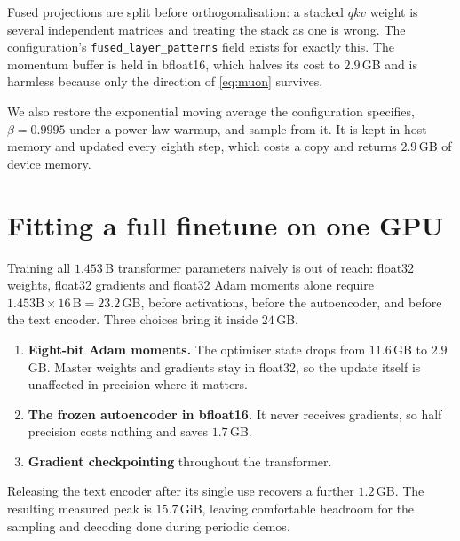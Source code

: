 \documentclass[10pt,twocolumn,letterpaper]{article}
\begin{document}
Fused projections are split before orthogonalisation: a stacked $qkv$ weight is
several independent matrices and treating the stack as one is wrong. The
configuration's \texttt{fused\_layer\_patterns} field exists for exactly this.
The momentum buffer is held in bfloat16, which halves its cost to $2.9$\,GB and
is harmless because only the direction of \eqref{eq:muon} survives.

We also restore the exponential moving average the configuration specifies,
$\beta = 0.9995$ under a power-law warmup, and sample from it. It is kept in host
memory and updated every eighth step, which costs a copy and returns $2.9$\,GB of
device memory.

\section{Fitting a full finetune on one GPU}
\label{sec:memory}

Training all $1.453$\,B transformer parameters naively is out of reach: float32 weights,
float32 gradients and float32 Adam moments alone require
$1.453\text{B} \times 16\,\text{B} = 23.2$\,GB, before activations, before the
autoencoder, and before the text encoder. Three choices bring it inside $24$\,GB.

\begin{enumerate}\itemsep2pt
\item \textbf{Eight-bit Adam moments.} The optimiser state drops from $11.6$\,GB to
$2.9$\,GB. Master weights and gradients stay in float32, so the update itself is
unaffected in precision where it matters.
\item \textbf{The frozen autoencoder in bfloat16.} It never receives gradients, so half
precision costs nothing and saves $1.7$\,GB.
\item \textbf{Gradient checkpointing} throughout the transformer.
\end{enumerate}

Releasing the text encoder after its single use recovers a further $1.2$\,GB. The
resulting measured peak is $15.7$\,GiB, leaving comfortable headroom for the sampling
and decoding done during periodic demos.
\end{document}
